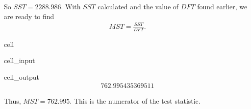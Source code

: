 \documentclass[letterpaper,10pt,english]{jupyterBook}
\begin{document}
\sphinxAtStartPar
So \(SST = 2288.986\). With \(SST\) calculated and the value of \(DFT\) found earlier, we are ready to find
\begin{equation*}
\begin{split} MST = \frac{SST}{DFT}. \end{split}
\end{equation*}
\begin{sphinxuseclass}{cell}\begin{sphinxVerbatimInput}

\begin{sphinxuseclass}{cell_input}
\begin{sphinxVerbatim}[commandchars=\\\{\}]

\end{sphinxVerbatim}

\end{sphinxuseclass}\end{sphinxVerbatimInput}
\begin{sphinxVerbatimOutput}

\begin{sphinxuseclass}{cell_output}\begin{equation*}
\begin{split}762.995435369511\end{split}
\end{equation*}
\end{sphinxuseclass}\end{sphinxVerbatimOutput}

\end{sphinxuseclass}
\sphinxAtStartPar
Thus, \(MST = 762.995\). This is the numerator of the test statistic.
\end{document}
